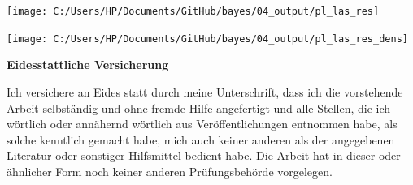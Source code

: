\documentclass[12pt,a4paper]{article}
\let\origfigure\figure
\let\endorigfigure\endfigure
\renewenvironment{figure}[1][2] {
    \expandafter\origfigure\expandafter[H]
} {
    \endorigfigure
}
\begin{document}
\newpage

\begin{figure}

\texttt{[image: C:/Users/HP/Documents/GitHub/bayes/04\_output/pl\_las\_res]} \hfill{}

\caption{ \label{fig:res_lasso} Plot of the Residuals vs Fitted Values for the LASSO Model}\label{fig:fig4}
\end{figure}

\begin{figure}

\texttt{[image: C:/Users/HP/Documents/GitHub/bayes/04\_output/pl\_las\_res\_dens]} \hfill{}

\caption{ \label{fig:res_lasso_dens} Density Plot of the Residuals of the LASSO Model}\label{fig:fig4_dens}
\end{figure}

\newpage
\newpage
\renewcommand*{\mkbibnamefamily}[1]{\textbf{#1}}
\renewcommand*{\mkbibnamegiven}[1]{\textbf{#1}}
\renewcommand*{\mkbibnameprefix}[1]{\textbf{#1}}
\renewcommand*{\mkbibnamesuffix}[1]{\textbf{#1}}


\printbibliography[title=References]


\newpage
\textbf{Eidesstattliche Versicherung}

\bigskip

Ich versichere an Eides statt durch meine Unterschrift, dass ich die vorstehende Arbeit selbständig und ohne fremde Hilfe angefertigt und alle Stellen, die ich wörtlich oder annähernd wörtlich aus Veröffentlichungen entnommen habe, als solche kenntlich gemacht habe, mich auch keiner anderen als der angegebenen Literatur oder sonstiger Hilfsmittel bedient habe. Die Arbeit hat in dieser oder ähnlicher Form noch keiner anderen Prüfungsbehörde vorgelegen.

\vspace{1cm}
\rule{0pt}{2\baselineskip} %
\par\noindent{} \hfill\makebox[2.25in]{\hrulefill}%
\par\noindent\makebox[2.25in][l]{} \hfill{}%
\end{document}
